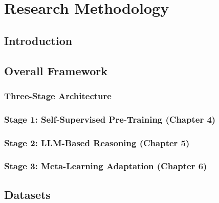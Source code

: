 %
%

\chapter{Research Methodology}
\label{chap:methodology}

\section{Introduction}

\section{Overall Framework}

\subsection{Three-Stage Architecture}

\subsection{Stage 1: Self-Supervised Pre-Training (Chapter 4)}

\subsection{Stage 2: LLM-Based Reasoning (Chapter 5)}

\subsection{Stage 3: Meta-Learning Adaptation (Chapter 6)}


\section{Datasets}

